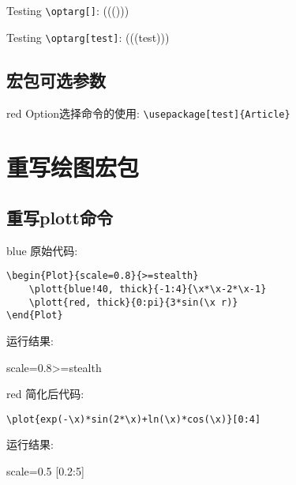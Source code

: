 \documentclass[fontset=windows, 12pt]{article}
\newcommand{\optarg}[1][]{%
    \ifthenelse{\isempty{#1}}%
    {}%
    {(((#1)))}%
}
\begin{document}
Testing \verb|\optarg[]|: \optarg[]%

Testing \verb|\optarg[test]|: \optarg[test]%

\subsection{宏包可选参数}
\begin{formal}{red}
    Option选择命令的使用: \verb |\usepackage[test]{Article}|\\
    \testcmd{}
\end{formal}

\section{重写绘图宏包}
\subsection{重写plott命令}
\begin{formal}{blue}
    原始代码:
\begin{verbatim}
\begin{Plot}{scale=0.8}{>=stealth}
    \plott{blue!40, thick}{-1:4}{\x*\x-2*\x-1}
    \plott{red, thick}{0:pi}{3*sin(\x r)}
\end{Plot}
\end{verbatim}

    \noindent 运行结果:
    \begin{center}
        \begin{Plot}{scale=0.8}{>=stealth}
        \end{Plot}
    \end{center}
\end{formal}

\begin{formal}{red}
    简化后代码:
\begin{verbatim}
\plot{exp(-\x)*sin(2*\x)+ln(\x)*cos(\x)}[0:4]    
\end{verbatim}  

    \noindent 运行结果:
    \begin{center}
        \begin{TikAxis}{scale=0.5}
            [0.2:5]
        \end{TikAxis}
    \end{center}
\end{formal}
\newpage
\end{document}
